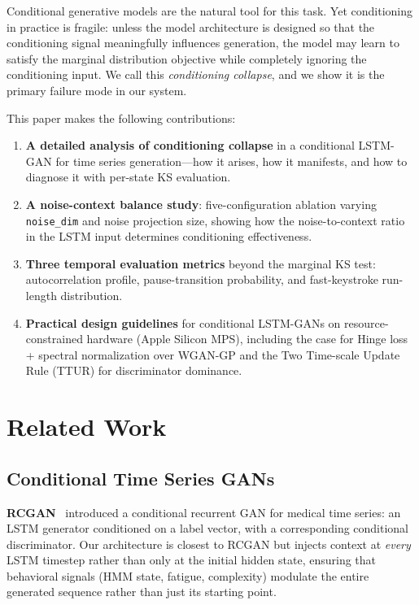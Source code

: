 \documentclass[sigconf,nonacm]{acmart}
\begin{document}
Conditional generative models are the natural tool for this task.
Yet conditioning in practice is fragile: unless the model architecture
is designed so that the conditioning signal meaningfully influences generation,
the model may learn to satisfy the marginal distribution objective while
completely ignoring the conditioning input.
We call this \emph{conditioning collapse}, and we show it is the primary
failure mode in our system.

This paper makes the following contributions:
\begin{enumerate}
  \item \textbf{A detailed analysis of conditioning collapse} in a conditional
    LSTM-GAN for time series generation---how it arises, how it manifests,
    and how to diagnose it with per-state KS evaluation.
  \item \textbf{A noise-context balance study}: five-configuration ablation
    varying \texttt{noise\_dim} and noise projection size, showing how the
    noise-to-context ratio in the LSTM input determines conditioning effectiveness.
  \item \textbf{Three temporal evaluation metrics} beyond the marginal KS test:
    autocorrelation profile, pause-transition probability, and fast-keystroke
    run-length distribution.
  \item \textbf{Practical design guidelines} for conditional LSTM-GANs on
    resource-constrained hardware (Apple Silicon MPS), including the case for
    Hinge loss + spectral normalization over WGAN-GP and the Two Time-scale
    Update Rule (TTUR) for discriminator dominance.
\end{enumerate}


\section{Related Work}

\subsection{Conditional Time Series GANs}

\textbf{RCGAN}~\cite{esteban2017rcgan} introduced a conditional recurrent GAN
for medical time series: an LSTM generator conditioned on a label vector,
with a corresponding conditional discriminator.
Our architecture is closest to RCGAN but injects context at \emph{every}
LSTM timestep rather than only at the initial hidden state, ensuring that
behavioral signals (HMM state, fatigue, complexity) modulate the entire
generated sequence rather than just its starting point.
\end{document}
